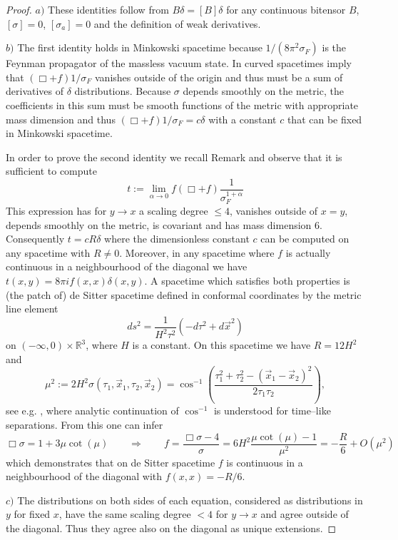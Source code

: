 \documentclass[11pt]{book}
\newcommand{\Rbb}{\mathbb{R}}
\theoremstyle{break}
\begin{document}
\begin{proof}




$a)$ These identities follow from $B\delta=[B]\delta$ for any continuous bitensor $B$, $[\sigma]=0$, $[\sigma_a]=0$ and the definition of weak derivatives.

$b)$ The first identity holds in Minkowski spacetime because $1/(8\pi^2\sigma_F)$ is the Feynman propagator of the massless vacuum state. In curved spacetimes %
imply that $(\Box+f)1/\sigma_F$ vanishes outside of the origin and thus must be a sum of derivatives of $\delta$ distributions. Because $\sigma$ depends smoothly on the metric, the coefficients in this sum must be smooth functions of the metric with appropriate mass dimension and thus $(\Box+f)1/\sigma_F=c\delta$ with a constant $c$ that can be fixed in Minkowski spacetime. 

In order to prove the second identity we recall Remark %
and observe that it is sufficient to compute 
%
$$
t:=\lim_{\alpha\to 0}f(\Box+f)\frac{1}{\sigma^{1+\alpha}_F}
$$
%
This expression has for $y\to x$ a scaling degree $\le 4$, vanishes outside of $x=y$, depends smoothly on the metric, is covariant and has mass dimension $6$. Consequently $t=cR\delta$ where the dimensionless constant $c$ can be computed on any spacetime with $R\neq 0$. Moreover, in any spacetime where $f$ is actually continuous in a neighbourhood of the diagonal we have $t(x,y)=8\pi i f(x,x) \delta(x,y)$. A spacetime which satisfies both properties is (the patch of) de Sitter spacetime defined in conformal coordinates by the metric line element 
%
$$ds^2=\frac{1}{H^2\tau^2}\left(-d\tau^2 + d\vec{x}^2\right)$$
%
on $(-\infty,0)\times\Rbb^3$, where $H$ is a constant. On this spacetime we have $R=12H^2$ and
%
$$\mu^2:=2 H^2 \sigma(\tau_1,\vec{x}_1,\tau_2,\vec{x}_2)=\cos^{-1}\left(\frac{\tau^2_1+\tau^2_2-(\vec{x}_1-\vec{x}_2)^2}{2\tau_1\tau_2}\right),$$
%
see e.g. %
, where analytic continuation of $\cos^{-1}$ is understood for time--like separations. From this one can infer 
%
$$
\Box \sigma = 1+3 \mu \cot (\mu) \qquad \Rightarrow \qquad f = \frac{\Box \sigma-4}{\sigma} = 6H^2 \frac{\mu \cot (\mu) - 1}{\mu^2}= -\frac{R}{6} + O(\mu^2)
$$
%
which demonstrates that on de Sitter spacetime $f$ is continuous in a neighbourhood of the diagonal with $f(x,x)=-R/6$. 

$c)$ The distributions on both sides of each equation, considered as distributions in $y$ for fixed $x$, have the same scaling degree $<4$ for $y\to x$ and agree outside of the diagonal. Thus they agree also on the diagonal as unique extensions.


\end{proof}
\end{document}
